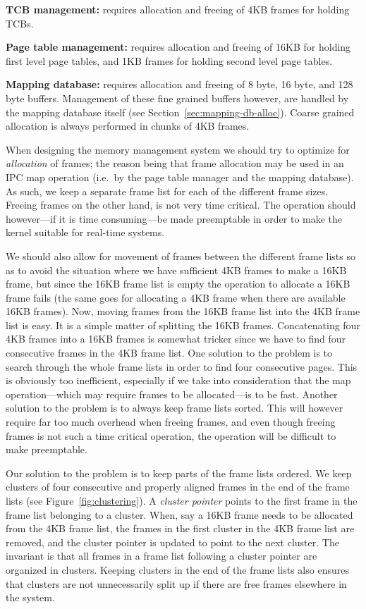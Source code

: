 \documentclass[a4paper,10pt,twoside]{article}
\begin{document}
\begin{description}
\item{\bf TCB management:} requires allocation and freeing of 4KB
  frames for holding TCBs.
\item{\bf Page table management:} requires allocation and freeing of
  16KB for holding first level page tables, and 1KB frames for holding 
  second level page tables.
\item{\bf Mapping database:} requires allocation and freeing of 8
  byte, 16 byte, and 128 byte buffers.  Management of these fine
  grained buffers however, are handled by the mapping database itself
  (see Section~\ref{sec:mapping-db-alloc}).  Coarse grained allocation
  is always performed in chunks of 4KB frames.
\end{description}

When designing the memory management system we should try to optimize
for \emph{allocation} of frames; the reason being that frame
allocation may be used in an IPC map operation (i.e.\ by the page
table manager and the mapping database).  As such, we keep a separate
frame list for each of the different frame sizes.  Freeing frames on
the other hand, is not very time critical.  The operation should
however---if it is time consuming---be made preemptable in order to
make the kernel suitable for real-time systems.

We should also allow for movement of frames between the different
frame lists so as to avoid the situation where we have sufficient 4KB
frames to make a 16KB frame, but since the 16KB frame list is empty
the operation to allocate a 16KB frame fails (the same goes for
allocating a 4KB frame when there are available 16KB frames).  Now,
moving frames from the 16KB frame list into the 4KB frame list is
easy.  It is a simple matter of splitting the 16KB frames.
Concatenating four 4KB frames into a 16KB frames is somewhat tricker
since we have to find four consecutive frames in the 4KB frame list.
One solution to the problem is to search through the whole frame lists
in order to find four consecutive pages.  This is obviously too
inefficient, especially if we take into consideration that the map
operation---which may require frames to be allocated---is to be fast.
Another solution to the problem is to always keep frame lists sorted.
This will however require far too much overhead when freeing frames,
and even though freeing frames is not such a time critical operation,
the operation will be difficult to make preemptable.

Our solution to the problem is to keep parts of the frame lists
ordered.  We keep clusters of four consecutive and properly aligned
frames in the end of the frame lists (see
Figure~\ref{fig:clustering}).  A \emph{cluster pointer} points to the
first frame in the frame list belonging to a cluster.  When, say a
16KB frame needs to be allocated from the 4KB frame list, the frames
in the first cluster in the 4KB frame list are removed, and the
cluster pointer is updated to point to the next cluster.  The
invariant is that all frames in a frame list following a cluster
pointer are organized in clusters.  Keeping clusters in the end of the
frame lists also ensures that clusters are not unnecessarily split up
if there are free frames elsewhere in the system.
\end{document}
